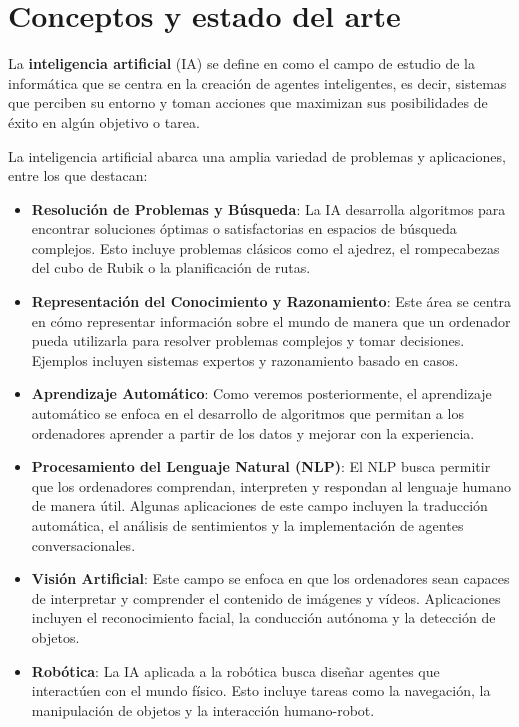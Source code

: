 
\chapter{Conceptos y estado del arte}

La \textbf{inteligencia artificial} (IA) se define en  \cite{russell2016artificial} como el campo de estudio de la informática que se centra en la creación de agentes inteligentes, es decir, sistemas que perciben su entorno y toman acciones que maximizan sus posibilidades de éxito en algún objetivo o tarea.

La inteligencia artificial abarca una amplia variedad de problemas y aplicaciones, entre los que destacan:

\begin{itemize}
	\item \textbf{Resolución de Problemas y Búsqueda}: La IA desarrolla algoritmos para encontrar soluciones óptimas o satisfactorias en espacios de búsqueda complejos. Esto incluye problemas clásicos como el ajedrez, el rompecabezas del cubo de Rubik o la planificación de rutas.
	
	\item \textbf{Representación del Conocimiento y Razonamiento}: Este área se centra en cómo representar información sobre el mundo de manera que un ordenador pueda utilizarla para resolver problemas complejos y tomar decisiones. Ejemplos incluyen sistemas expertos y razonamiento basado en casos.
	
	\item \textbf{Aprendizaje Automático}: Como veremos posteriormente, el aprendizaje automático se enfoca en el desarrollo de algoritmos que permitan a los ordenadores aprender a partir de los datos y mejorar con la experiencia.
	
	\item \textbf{Procesamiento del Lenguaje Natural (NLP)}: El NLP busca permitir que los ordenadores comprendan, interpreten y respondan al lenguaje humano de manera útil. Algunas aplicaciones de este campo incluyen la traducción automática, el análisis de sentimientos y la implementación de agentes conversacionales.
	
	\item \textbf{Visión Artificial}: Este campo se enfoca en que los ordenadores sean capaces de interpretar y comprender el contenido de imágenes y vídeos. Aplicaciones incluyen el reconocimiento facial, la conducción autónoma y la detección de objetos.
	
	\item \textbf{Robótica}: La IA aplicada a la robótica busca diseñar agentes que interactúen con el mundo físico. Esto incluye tareas como la navegación, la manipulación de objetos y la interacción humano-robot.
\end{itemize}

